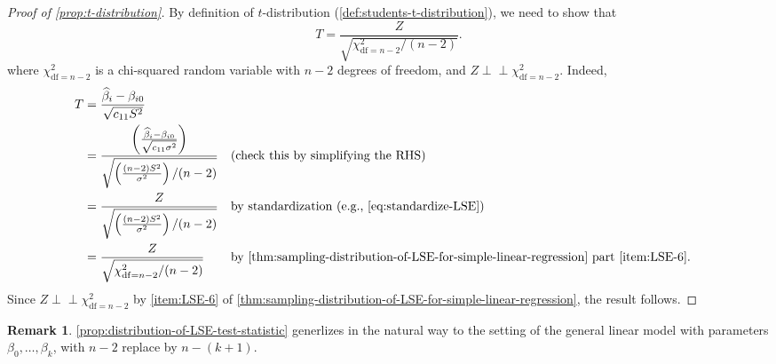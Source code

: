 \documentclass[10pt]{article}
\theoremstyle{definition}
\newtheorem{remark}[theorem]{Remark}
\newcommand{\1}[1]{\textbf{1}_{\left[#1\right]}} %
\newcommand{\indep}{\perp \!\!\! \perp}  %
\begin{document}
\begin{proof}[Proof of \cref{prop:t-distribution}]
  By definition of $t$-distribution (\cref{def:students-t-distribution}), we
  need to show that
  \begin{equation*}
    T = \frac{Z}{\sqrt{\chi^{2}_{\mathrm{df}=n-2}/(n-2)}}.
  \end{equation*}
  where $\chi^{2}_{\mathrm{df}=n-2}$ is a chi-squared random variable with $n-2$ degrees of freedom,
  and $Z\indep \chi^{2}_{\mathrm{df}=n-2}$.
  Indeed,
  \begin{align*}
    T &=\frac{\widehat{\beta}_{i}-\beta_{i0}}{\sqrt{c_{11}S^{2}}}\\
      &= \frac{\left( \frac{\widehat{\beta}_{i}-\beta_{i0}}{\sqrt{c_{11}\sigma^{2}}} \right) }{ \sqrt{\left( \frac{(n-2)S^{2}}{\sigma^{2}} \right)/(n-2) }}
      &&\text{(check this by simplifying the RHS)}\\
      &= \frac{Z }{ \sqrt{\left( \frac{(n-2)S^{2}}{\sigma^{2}} \right)/(n-2)
        }} &&\text{by standardization (e.g., \cref{eq:standardize-LSE})}\\
      &=\frac{Z }{ \sqrt{\chi^{2}_{\mathrm{df}=n-2}/(n-2) }} &&\text{by \cref{thm:sampling-distribution-of-LSE-for-simple-linear-regression} part \ref{item:LSE-6}}.\\
  \end{align*}
  Since $Z\indep \chi^{2}_{\mathrm{df}=n-2}$ by \ref{item:LSE-6} of
  \cref{thm:sampling-distribution-of-LSE-for-simple-linear-regression}, the
  result follows.
\end{proof}
\begin{remark}
  \cref{prop:distribution-of-LSE-test-statistic} generlizes in the natural way
  to the setting of the general linear model with parameters
  $\beta_{0},\ldots,\beta_{k}$, with $n-2$ replace by $n-(k+1)$.
\end{remark}
\end{document}

